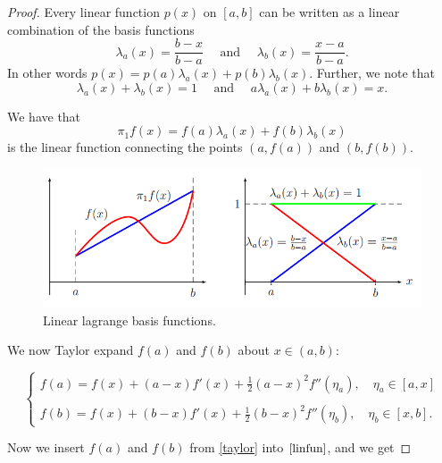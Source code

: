 \documentclass[12pt, a4paper]{article}
\numberwithin{equation}{section}
\begin{document}
\begin{proof}
Every linear function $p(x)$ on $[a,b]$ can be written as a linear combination of the basis functions
\begin{equation*}
\lambda_a(x) = \frac{b-x}{b-a} \quad \text{ and } \quad \lambda_b(x) = \frac{x-a}{b-a}.
\end{equation*}
In other words $p(x) = p(a)\lambda_a(x)+p(b)\lambda_b(x)$. Further, we note that
\begin{equation*}
\lambda_a(x) + \lambda_b(x) = 1 \quad \text{ and } \quad a\lambda_a(x) + b\lambda_b(x) = x.
\end{equation*}

\noindent We have that 
\begin{equation}
\label{linfun}
\pi_1 f(x) = f(a)\lambda_a(x) + f(b)\lambda_b(x)
\end{equation}
is the linear function connecting the points $(a,f(a))$ and $(b,f(b))$.

\begin{figure}[H]
\centering
\includegraphics[scale=0.7]{th3_1_fig.png}
\caption{Linear lagrange basis functions.}
\label{sn}
\end{figure}

We now Taylor expand $f(a)$ and $f(b)$ about $x\in(a,b)$:

\begin{equation}
\label{taylor}
\left\{ \begin{array}{l}

f(a) = f(x) + (a-x)f'(x) + \frac{1}{2}(a-x)^2 f''(\eta_a), \quad \eta_a\in [a,x]\\
\\
f(b) = f(x) + (b-x)f'(x) + \frac{1}{2}(b-x)^2 f''(\eta_b), \quad \eta_b\in [x,b].

\end{array}\right.
\end{equation}

Now we insert $f(a)$ and $f(b)$ from \eqref{taylor} into $\eqref{linfun}$, and we get


\end{proof}
\end{document}
